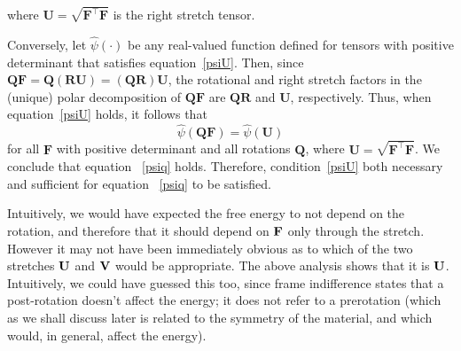 where \( \mathbf{U} = \sqrt{\mathbf{F}^\top \mathbf{F}} \) is the right stretch tensor.  


Conversely, let \( \widehat{\psi}(\cdot) \) be any real-valued function defined for tensors with positive determinant  
that satisfies equation~\eqref{psiU}. Then, since \( \mathbf{Q} \mathbf{F} = \mathbf{Q} (\mathbf{R} \mathbf{U}) = (\mathbf{Q} \mathbf{R}) \mathbf{U} \),  
the rotational and right stretch factors in the (unique) polar decomposition of \( \mathbf{Q} \mathbf{F} \) are \( \mathbf{Q} \mathbf{R} \) and \( \mathbf{U} \), respectively.  
Thus, when equation~\eqref{psiU} holds, it follows that  
\[
\widehat{\psi}(\mathbf{Q} \mathbf{F}) = \widehat{\psi}(\mathbf{U})
\]  
for all \( \mathbf{F} \) with positive determinant and all rotations \( \mathbf{Q} \), where \( \mathbf{U} = \sqrt{\mathbf{F}^\top \mathbf{F}} \).  
We conclude that equation~ \eqref{psiq} holds.  
Therefore, condition~\eqref{psiU} both necessary and sufficient for equation~ \eqref{psiq}  to be satisfied.


\begin{remark}
	Intuitively, we would have expected the free energy to not depend on the rotation,
	and therefore that it should depend on $\mathbf{F}$ only through the stretch. However it may not have
	been immediately obvious as to which of the two stretches $\mathbf{U}$ and $\mathbf{V}$ would be appropriate.
	The above analysis shows that it is $\mathbf{U}$. Intuitively, we could have guessed this too, since
	frame indifference states that a post-rotation doesn't affect the energy; it does not refer to a
	prerotation (which as we shall discuss later is related to the symmetry of the material, and
	which would, in general, affect the energy).
\end{remark}

